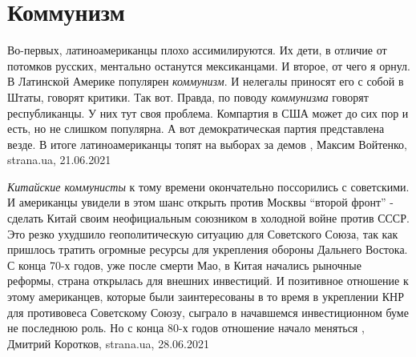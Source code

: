  
 
 
 
 
\chapter{Коммунизм}
\label{sec:slova.kommunizm}

Во-первых, латиноамериканцы плохо ассимилируются. Их дети, в отличие от
потомков русских, ментально останутся мексиканцами. И второе, от чего я орнул.
В Латинской Америке популярен \emph{коммунизм}. И нелегалы приносят его с собой
в Штаты, говорят критики. Так вот. Правда, по поводу \emph{коммунизма} говорят
республиканцы. У них тут своя проблема. Компартия в США может до сих пор и
есть, но не слишком популярна. А вот демократическая партия представлена везде.
В итоге латиноамериканцы топят на выборах за демов
, 
Максим Войтенко, strana.ua, 21.06.2021


\emph{Китайские коммунисты} к тому времени окончательно поссорились с советскими. И
американцы увидели в этом шанс открыть против Москвы \enquote{второй фронт} - сделать
Китай своим неофициальным союзником в холодной войне против СССР. Это резко
ухудшило геополитическую ситуацию для Советского Союза, так как пришлось
тратить огромные ресурсы для укрепления обороны Дальнего Востока.  С конца 70-х
годов, уже после смерти Мао, в Китая начались рыночные реформы, страна
открылась для внешних инвестиций. И позитивное отношение к этому американцев,
которые были заинтересованы в то время в укреплении КНР для противовеса
Советскому Союзу, сыграло в начавшемся инвестиционном буме не последнюю роль.
Но с конца 80-х годов отношение начало меняться
, 
Дмитрий Коротков, strana.ua, 28.06.2021
